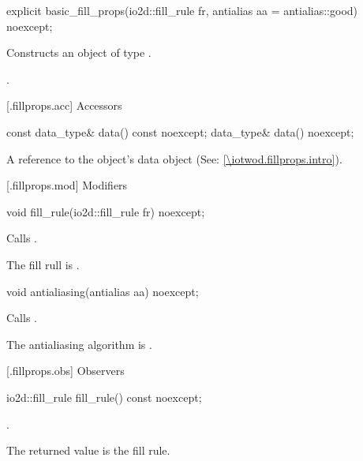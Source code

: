 %
\begin{itemdecl}
explicit basic_fill_props(io2d::fill_rule fr, antialias aa = antialias::good) 
  noexcept;
\end{itemdecl}
\begin{itemdescr}
\pnum
\effects
Constructs an object of type .

\pnum
\postconditions
{}.
\end{itemdescr}

 [\iotwod.fillprops.acc] {Accessors}

%
\begin{itemdecl}
const data_type& data() const noexcept;
data_type& data() noexcept;
\end{itemdecl}
\begin{itemdescr}
\pnum
\returns A reference to the  object's data object (See: \ref{\iotwod.fillprops.intro}).
\end{itemdescr}

 [\iotwod.fillprops.mod] {Modifiers}

%
\begin{itemdecl}
void fill_rule(io2d::fill_rule fr) noexcept;
\end{itemdecl}
\begin{itemdescr}
\pnum
\effects
Calls .

\remarks
The fill rull is .
\end{itemdescr}

%
\begin{itemdecl}
void antialiasing(antialias aa) noexcept;
\end{itemdecl}
\begin{itemdescr}
\pnum
\effects
Calls .

\remarks
The antialiasing algorithm is .
\end{itemdescr}

 [\iotwod.fillprops.obs] {Observers}

%
\begin{itemdecl}
io2d::fill_rule fill_rule() const noexcept;
\end{itemdecl}
\begin{itemdescr}
\pnum
\returns
{}.

\pnum
\remarks
The returned value is the fill rule.
\end{itemdescr}

